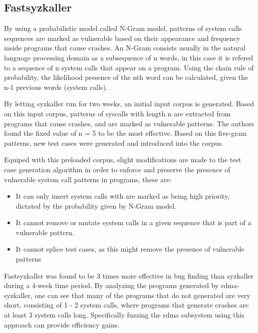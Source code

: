\subsection{Fastsyzkaller}

By using a probabilistic model called N-Gram model, patterns of system calls sequences are marked as vulnerable based on their appearance and
frequency inside programs that cause crashes. An N-Gram consists usually in the natural language processing domain as a subsequence
of n words, in this case it is refered to a sequence of n system calls that appear on a program. Using the chain rule
of probability, the likelihood presence of the nth word can be calculated, given the n-1 previous words (system calls).

By letting syzkaller run for two weeks, an initial input corpus is generated. Based on this input corpus,
patterns of syscalls with length n are extracted from programs that cause crashes, and are marked as vulnerable
patterns. The authors found the fixed value of n = 5 to be the most effective\cite{fastsyzkaller}.
Based on this five-gram patterns, new test cases were generated and introduced into the corpus.

Equiped with this preloaded corpus, slight modifications are made to the test case generation algorithm in order
to enforce and preserve the presence of vulnerable system call patterns in programs, these are:

\begin{itemize}
  \item It can only insert system calls with are marked as being high priority, dictated by the probability given by N-Gram model.
  \item It cannot remove or mutate system calls in a given sequence that is part of a vulnerable pattern.
  \item It cannot splice test cases, as this might remove the presence of vulnerable patterns
\end{itemize}

Fastsyzkaller was found to be 3 times more effective in bug finding than syzkaller during a 4-week time period.
By analyzing the programs generated by rdma-syzkaller, one can see that many of the programs that do not generated are very short, consisting
of 1 - 2 system calls, where programs that generate crashes are at least 3 system calls long. Specifically fuzzing the rdma subsystem using this
approach can provide efficiency gains.



